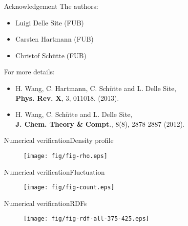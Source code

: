 \documentclass{beamer}
\begin{document}
\begin{frame}{Acknowledgement}
  \vfill
  The authors:
  \begin{itemize}
  \item Luigi Delle Site (FUB)
  \item Carsten Hartmann (FUB)
  \item Christof Sch\"utte (FUB)
  \end{itemize}
  \vfill
  For more details:
  \begin{itemize}
  \item H. Wang, C. Hartmann, C. Sch\"utte and L. Delle Site,\\
    \textbf{Phys. Rev. X}, 3, 011018, (2013).
  \item H. Wang, C. Sch\"utte and L. Delle Site,\\
    \textbf{J. Chem. Theory \& Compt.}, 8(8), 2878-2887 (2012).
  \end{itemize}
  \vfill
\end{frame}



\begin{frame}{Numerical verification}{Density profile}
  \begin{figure}
    \centering 
    \texttt{[image: fig/fig-rho.eps]}
  \end{figure}  
\end{frame}

\begin{frame}{Numerical verification}{Fluctuation}
  \begin{figure}
    \centering 
    \texttt{[image: fig/fig-count.eps]}
  \end{figure}  
\end{frame}

\begin{frame}{Numerical verification}{RDFs}
  \begin{figure}
    \centering 
    \texttt{[image: fig/fig-rdf-all-375-425.eps]}
  \end{figure}  
\end{frame}
\end{document}
